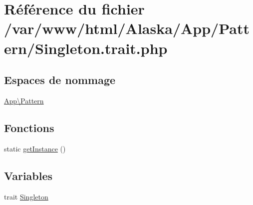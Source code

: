 \hypertarget{_singleton_8trait_8php}{}\section{Référence du fichier /var/www/html/\+Alaska/\+App/\+Pattern/\+Singleton.trait.\+php}
\label{_singleton_8trait_8php}
\subsection*{Espaces de nommage}
\begin{DoxyCompactItemize}
\item 
 \hyperlink{namespace_app_1_1_pattern}{App\textbackslash{}\+Pattern}
\end{DoxyCompactItemize}
\subsection*{Fonctions}
\begin{DoxyCompactItemize}
\item 
static \hyperlink{namespace_app_1_1_pattern_a0c11e0e56c6a5589b98f956835d91862}{get\+Instance} ()
\end{DoxyCompactItemize}
\subsection*{Variables}
\begin{DoxyCompactItemize}
\item 
trait \hyperlink{namespace_app_1_1_pattern_a90c7994df18fc2d358849f9a46502bc1}{Singleton}
\end{DoxyCompactItemize}
